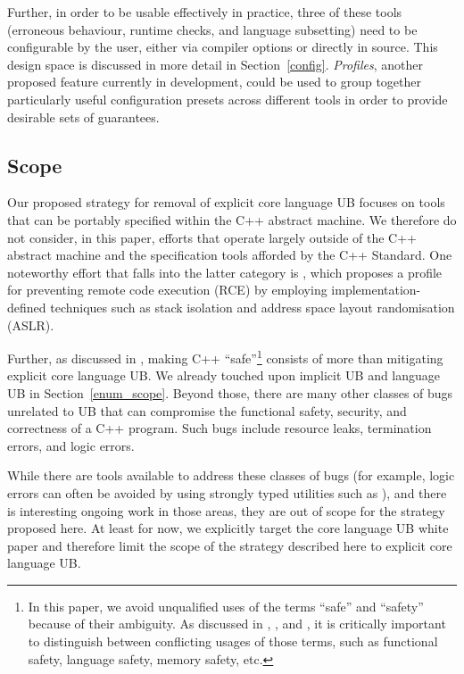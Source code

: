 {Further, in order to be usable effectively in practice, three of these tools (erroneous behaviour, runtime checks, and language subsetting) need to be configurable by the user, either via compiler options or directly in source. This design space is discussed in more detail in Section~\ref{config}. \emph{Profiles}, another proposed feature currently in development, could be used to group together particularly useful configuration presets across different tools in order to provide desirable sets of guarantees.

\subsection{Scope}

Our proposed strategy for removal of explicit core language UB focuses on tools that can be portably specified within the C++ abstract machine. We therefore do not consider, in this paper, efforts that operate largely outside of the C++ abstract machine and the specification tools afforded by the C++ Standard. One noteworthy effort that falls into the latter category is  \cite{P3627R0}, which proposes a profile for preventing remote code execution (RCE) by employing implementation-defined techniques such as stack isolation and address space layout randomisation (ASLR).

Further, as discussed in \cite{P3700R0}, making C++ ``safe''\footnote{In this paper, we avoid unqualified uses of the terms ``safe'' and ``safety'' because of their ambiguity. As discussed in \cite{P3376R0}, \cite{P3500R1}, and \cite{P3578R0}, it is critically important to distinguish between conflicting usages of those terms, such as functional safety, language safety, memory safety, etc.} consists of more than mitigating explicit core language UB. We already touched upon implicit UB and language UB in Section~\ref{enum_scope}. Beyond those, there are many other classes of bugs unrelated to UB that can compromise the functional safety, security, and correctness of a C++ program. Such bugs include resource leaks, termination errors, and logic errors. 

While there are tools available to address these classes of bugs (for example, logic errors can often be avoided by using strongly typed utilities such as \cite{P3045R6}), and there is interesting ongoing work in those areas, they are out of scope for the strategy proposed here. At least for now, we explicitly target the core language UB white paper \cite{P3656R1} and therefore limit the scope of the strategy described here to explicit core language UB. 

}
